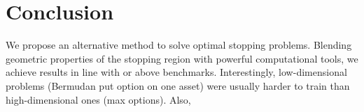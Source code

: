 \section{Conclusion}  

We propose an alternative method to solve %
optimal stopping problems. Blending geometric properties of the stopping region with powerful computational tools, we achieve results in line with or above benchmarks. Interestingly, low-dimensional problems (Bermudan put option on one asset) were usually harder to train than high-dimensional ones (max options). Also, 